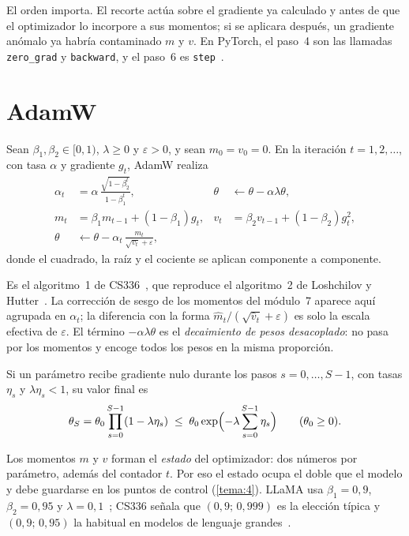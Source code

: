 El orden importa. El recorte actúa sobre el gradiente ya calculado y antes de que el optimizador lo incorpore a sus momentos; si se aplicara después, un gradiente anómalo ya habría contaminado $m$ y $v$. En PyTorch, el paso~4 son las llamadas \texttt{zero\_grad} y \texttt{backward}, y el paso~6 es \texttt{step}~\cite[§4.2.1]{cs336}.

\section{AdamW}

\begin{definicion}\label{def:adamw-impl}
Sean $\beta_1,\beta_2\in[0,1)$, $\lambda\ge 0$ y $\varepsilon>0$, y sean $m_0=v_0=0$. En la iteración $t=1,2,\dots$, con tasa $\alpha$ y gradiente $g_t$, AdamW realiza
\begin{align*}
\alpha_t&=\alpha\,\frac{\sqrt{1-\beta_2^{t}}}{1-\beta_1^{t}}, &
\theta&\leftarrow\theta-\alpha\lambda\theta,\\
m_t&=\beta_1 m_{t-1}+(1-\beta_1)g_t, &
v_t&=\beta_2 v_{t-1}+(1-\beta_2)g_t^{2},\\
\theta&\leftarrow\theta-\alpha_t\,\frac{m_t}{\sqrt{v_t}+\varepsilon}, &&
\end{align*}
donde el cuadrado, la raíz y el cociente se aplican componente a componente.
\end{definicion}

Es el algoritmo~1 de CS336~\cite[§4.3]{cs336}, que reproduce el algoritmo~2 de Loshchilov y Hutter~\cite{adamw}. La corrección de sesgo de los momentos del módulo~7 aparece aquí agrupada en $\alpha_t$; la diferencia con la forma $\hat m_t/(\sqrt{\hat v_t}+\varepsilon)$ es solo la escala efectiva de $\varepsilon$. El término $-\alpha\lambda\theta$ es el \emph{decaimiento de pesos desacoplado}: no pasa por los momentos y encoge todos los pesos en la misma proporción.

\begin{proposicion}\label{prop:encoge}
Si un parámetro recibe gradiente nulo durante los pasos $s=0,\dots,S-1$, con tasas $\eta_s$ y $\lambda\eta_s<1$, su valor final es
\[
\theta_S=\theta_0\prod_{s=0}^{S-1}(1-\lambda\eta_s)\;\le\;\theta_0\exp\Bigl(-\lambda\sum_{s=0}^{S-1}\eta_s\Bigr)\qquad(\theta_0\ge 0).
\]
\end{proposicion}

\addtocounter{definicion}{1}%

Los momentos $m$ y $v$ forman el \emph{estado} del optimizador: dos números por parámetro, además del contador $t$. Por eso el estado ocupa el doble que el modelo y debe guardarse en los puntos de control (\cref{tema:4}). LLaMA usa $\beta_1=0{,}9$, $\beta_2=0{,}95$ y $\lambda=0{,}1$~\cite[§2.3]{llama}; CS336 señala que $(0{,}9;\allowbreak\,0{,}999)$ es la elección típica y $(0{,}9;\allowbreak\,0{,}95)$ la habitual en modelos de lenguaje grandes~\cite[§4.3]{cs336}.

